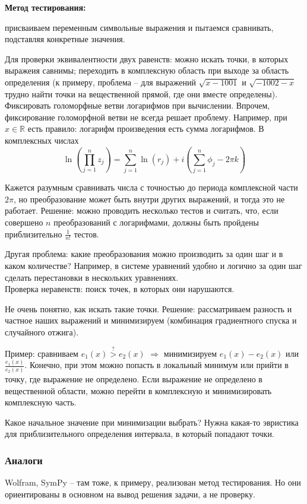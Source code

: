 \documentclass[main.tex]{subfiles}
\begin{document}
\textbf{Метод тестирования:}

присваиваем переменным символьные выражения и пытаемся сравнивать, подставляя конкретные значения.

Для проверки эквивалентности двух равенств: можно искать точки, в которых выражеия савнимы; переходить в комплексную область при выходе за область определения (к примеру, проблема -- для выражений $ \sqrt{x - 1001} $ и $ \sqrt{ -1002 - x } $ трудно найти точки на вещественной прямой, где они вместе определены).
Фиксировать голоморфные ветви логарифмов при вычислении.
Впрочем, фиксирование голоморфной ветви не всегда решает проблему.
Например, при $ x \in \mathds{R} $ есть правило: логарифм произведения есть сумма логарифмов.
В комплексных числах
\[ \ln \left( \prod_{j=1}^{n} z_j \right) = \sum_{j=1}^{n} \ln (r_j) + i \left( \sum_{j=1}^n \phi_j - 2 \pi k \right) \]

Кажется разумным сравнивать числа с точностью до периода комплексной части $ 2 \pi $, но преобразование может быть внутри других выражений, и тогда это не работает.
Решение: можно проводить несколько тестов и считать, что, если совершено $ n $ преобразований с логарифмами, должны быть пройдены приблизительно $ \frac{1}{n!} $ тестов. 

Другая проблема: какие преобразования можно производить за один шаг и в каком количестве?
Например, в системе уравнений удобно и логично за один шаг сделать перестановки в нескольких уравнениях. \\

Проверка неравенств:
поиск точек, в которых они нарушаются.

Не очень понятно, как искать такие точки.
Решение: рассматриваем разность и частное наших выражений и минимизируем (комбинация градиентного спуска и случайного отжига).

Пример: сравниваем $ e_1(x) \overset{?}> e_2(x) $ $ \Rightarrow $ минимизируем $ e_1(x) - e_2(x) $ или  $ \frac{e_1(x)}{e_2(x)}  $.
Конечно, при этом можно попасть в локальный минимум или прийти в точку, где выражение не определено.
Если выражение не определено в вещественной области, можно перейти в комплексную и минимизировать комплексную часть.

Какое начальное значение при минимизации выбрать?
Нужна какая-то эвристика для приблизительного определения интервала, в который попадают точки.

\subsubsection{ Аналоги }
Wolfram, SymPy -- там тоже, к примеру, реализован метод тестирования.
Но они ориентированы в основном на вывод решения задачи, а не проверку.

	
\end{document}
